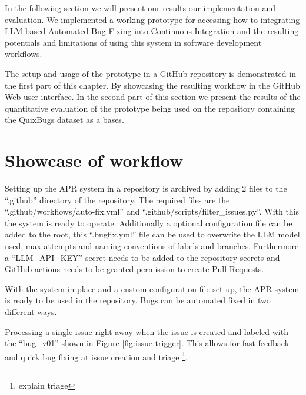 In the following section we will present our results our implementation and evaluation. We implemented a working prototype for accessing how to integrating LLM based Automated Bug Fixing into Continuous Integration and the resulting potentials and limitations of using this system in software development workflows.

The setup and usage of the prototype in a GitHub repository is demonstrated in the first part of this chapter. By showcasing the resulting workflow in the GitHub Web user interface. In the second part of this section we  present the results of the quantitative evaluation of the prototype being used on the repository containing the QuixBugs dataset as a bases.

\section{Showcase of workflow} \label{section:showcase}

Setting up the APR system in a repository is archived by adding 2 files to the ``.github'' directory of the repository. The required files are the ``.github/workflows/auto-fix.yml'' and ``.github/scripts/filter\_issues.py''. With this the system is ready to operate. Additionally a optional configuration file can be added to the root, this ``.bugfix.yml'' file can be used to overwrite the LLM model used, max attempts and naming conventions of labels and branches. Furthermore a ``LLM\_API\_KEY'' secret needs to be added to the repository secrets and GitHub actions needs to be granted permission to create Pull Requests.

With the system in place and a custom configuration file set up, the APR system is ready to be used in the repository. Bugs can be automated fixed in two different ways.

Processing a single issue right away when the issue is created and labeled with the ``bug\_v01'' shown in Figure \ref{fig:issue-trigger}. This allows for fast feedback and quick bug fixing at issue creation and triage \footnote{explain triage}.


